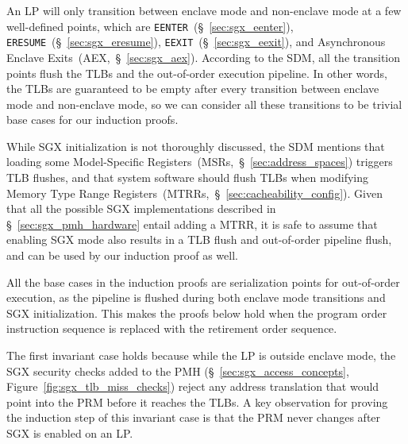 
An LP will only transition between enclave mode and non-enclave mode at a few
well-defined points, which are \texttt{EENTER}~(\S~\ref{sec:sgx_eenter}),
\texttt{ERESUME}~(\S~\ref{sec:sgx_eresume}),
\texttt{EEXIT}~(\S~\ref{sec:sgx_eexit}),
and Asynchronous Enclave Exits~(AEX,~\S~\ref{sec:sgx_aex}). According to the
SDM, all the transition points flush the TLBs and the out-of-order execution
pipeline. In other words, the TLBs are guaranteed to be empty after every
transition between enclave mode and non-enclave mode, so we can consider all
these transitions to be trivial base cases for our induction proofs.

While SGX initialization is not thoroughly discussed, the SDM mentions that
loading some Model-Specific Registers~(MSRs,~\S~\ref{sec:address_spaces})
triggers TLB flushes, and that system software should flush TLBs when modifying
Memory Type Range Registers~(MTRRs,~\S~\ref{sec:cacheability_config}). Given
that all the possible SGX implementations described in
\S~\ref{sec:sgx_pmh_hardware} entail adding a MTRR, it is safe to assume that
enabling SGX mode also results in a TLB flush and out-of-order pipeline flush,
and can be used by our induction proof as well.

All the base cases in the induction proofs are serialization points for
out-of-order execution, as the pipeline is flushed during both enclave mode
transitions and SGX initialization. This makes the proofs below hold when the
program order instruction sequence is replaced with the retirement order
sequence.

The first invariant case holds because while the LP is outside enclave mode,
the SGX security checks added to the PMH (\S~\ref{sec:sgx_access_concepts},
Figure~\ref{fig:sgx_tlb_miss_checks}) reject any address translation that would
point into the PRM before it reaches the TLBs. A key observation for proving
the induction step of this invariant case is that the PRM never changes after
SGX is enabled on an LP.

